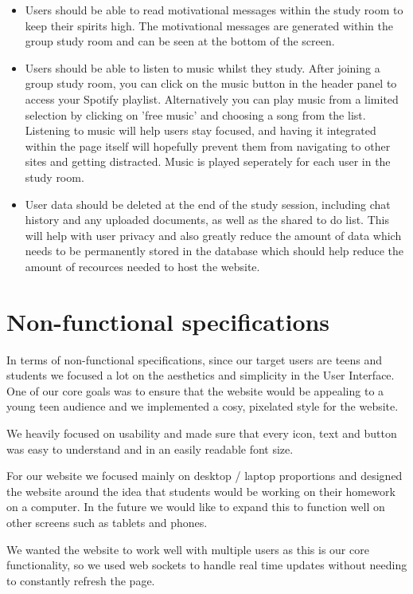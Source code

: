 \begin{itemize}
\item Users should be able to read motivational messages within the study room to keep their spirits high. The motivational messages are generated within the group study room and can be seen at the bottom of the screen.
\item Users should be able to listen to music whilst they study. After joining a group study room, you can click on the music button in the header panel to access your Spotify playlist. Alternatively you can play music from a limited selection by clicking on 'free music' and choosing a song from the list. Listening to music will help users stay focused, and having it integrated within the page itself will hopefully prevent them from navigating to other sites and getting distracted. Music is played seperately for each user in the study room.
\item User data should be deleted at the end of the study session, including chat history and any uploaded documents, as well as the shared to do list. This will help with user privacy and also greatly reduce the amount of data which needs to be permanently stored in the database which should help reduce the amount of recources needed to host the website.
\end{itemize}


\section{Non-functional specifications}
\label{sect:non-functional-specifications}

In terms of non-functional specifications, since our target users are teens and students we focused a lot on the aesthetics and simplicity in the User Interface. One of our core goals was to ensure that the website would be appealing to a young teen audience and we implemented a cosy, pixelated style for the website.

We heavily focused on usability and made sure that every icon, text and button was easy to understand and in an easily readable font size.

For our website we focused mainly on desktop / laptop proportions and designed the website around the idea that students would be working on their homework on a computer. In the future we would like to expand this to function well on other screens such as tablets and phones.

We wanted the website to work well with multiple users as this is our core functionality, so we used web sockets to handle real time updates without needing to constantly refresh the page.

